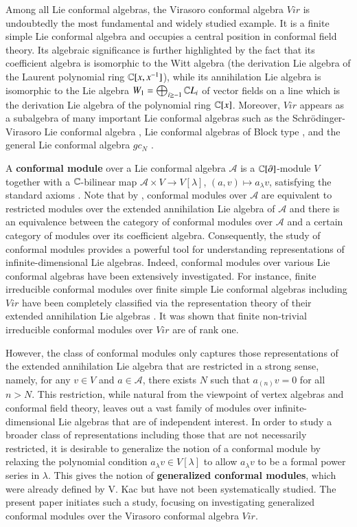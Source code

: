 \documentclass[12pt]{amsart}
\begin{document}
 Among all Lie conformal algebras, the Virasoro conformal algebra $Vir$
 is  undoubtedly the most fundamental and widely studied example. It is a finite simple Lie conformal algebra \cite{DK} and occupies a central position in conformal field theory.  Its algebraic significance is further highlighted by the fact that its coefficient algebra is isomorphic to the Witt algebra (the derivation Lie algebra of the Laurent polynomial ring $\mathbb{C}[x,x^{-1}]$), while its annihilation Lie algebra is isomorphic to the Lie algebra $W_1=\bigoplus_{i\geq -1}\mathbb{C} L_i$ of vector fields on a line which is the derivation Lie algebra of the polynomial ring $\mathbb{C}[x]$. Moreover, $Vir$ appears as a subalgebra of many important Lie conformal algebras such as the Schr\"odinger-Virasoro Lie conformal algebra \cite{SY}, Lie conformal algebras of Block type \cite{SXY}, and the general Lie conformal algebra $gc_N$ \cite{DK2}.

 A {\bf conformal module} over a Lie conformal algebra $\mathcal {A}$ is a $\mathbb{C}[\partial]$-module $V$ together with a $\mathbb{C}$-bilinear map $\mathcal {A}\times V\rightarrow V[\lambda]$, $(a,v)\mapsto a_\lambda v$, satisfying the standard axioms \cite{CK}. Note that by \cite{K1},  conformal modules over $\mathcal {A}$ are equivalent to restricted modules over the extended annihilation Lie algebra of $\mathcal {A}$ and there is an equivalence between the category of conformal modules over $\mathcal {A}$ and a certain category of modules over its coefficient algebra. Consequently, the study of conformal modules provides a powerful tool for understanding representations of infinite-dimensional Lie algebras. Indeed, conformal modules over various Lie conformal algebras have been extensively investigated. For instance,
finite irreducible conformal modules over finite simple Lie conformal algebras including $Vir$ have been completely classified via the representation theory of their extended annihilation Lie algebras \cite{CK}. It was shown that finite non-trivial irreducible conformal modules over $Vir$ are of rank one.

However, the class of conformal modules only captures those representations of the extended annihilation Lie algebra that are restricted in a strong sense, namely, for any $v\in V$ and $a\in \mathcal {A}$, there exists $N$ such that $a_{(n)}v=0$ for all $n>N$. This restriction, while natural from the viewpoint of vertex algebras and conformal field theory, leaves out a vast family of modules over infinite-dimensional Lie algebras that are of independent interest. In order to  study a broader  class of representations including those that are not necessarily restricted, it is desirable to generalize the notion of a conformal module by relaxing the polynomial condition $a_\lambda v\in V[\lambda]$ to allow $a_\lambda v$ to be a formal power series in $\lambda$. This gives the notion of {\bf generalized conformal modules}, which were already defined by V. Kac \cite{K1} but have not been systematically studied. The present paper initiates such a study, focusing on investigating generalized conformal modules over the Virasoro conformal algebra $Vir$.
\end{document}
